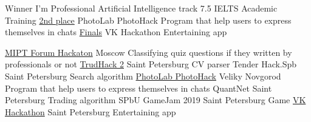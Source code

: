 \documentclass[
	a4paper,
]{fortysecondscv}
\begin{document}
\begin{cvtable}[1.5]
        {Winner}
        {I'm Professional}
        {Artificial Intelligence track}
        {7.5}
        {IELTS}
        {Academic Training}
        {\href{https://github.com/SmirnovAlexander/EmojiCommunicator}
        {2nd place}}
        {PhotoLab PhotoHack}
        {Program that help users to express themselves in chats}
        {\href{https://github.com/SmirnovAlexander/MemDer}
        {Finals}}
        {VK Hackathon}
        {Entertaining app}
\end{cvtable}

\begin{cvtable}[1.5]
        {\href{https://github.com/SmirnovAlexander/QuestionsClassifier}
        {MIPT Forum Hackaton}}
        {Moscow}
        {Classifying quiz questions if they written by professionals or not}
        {\href{https://github.com/SmirnovAlexander/ParseCV}
        {TrudHack 2}}
        {Saint Petersburg}
        {CV parser}
        {Tender Hack.Spb}
        {Saint Petersburg}
        {Search algorithm}
        {\href{https://github.com/SmirnovAlexander/EmojiCommunicator}
        {PhotoLab PhotoHack}}
        {Veliky Novgorod}
        {Program that help users to express themselves in chats}
        {QuantNet}
        {Saint Petersburg}
        {Trading algorithm}
        {SPbU GameJam 2019}
        {Saint Petersburg}
        {Game}
        {\href{https://github.com/SmirnovAlexander/MemDer}
        {VK Hackathon}}
        {Saint Petersburg}
        {Entertaining app}
\end{cvtable}


\cvsignature
\end{document}

